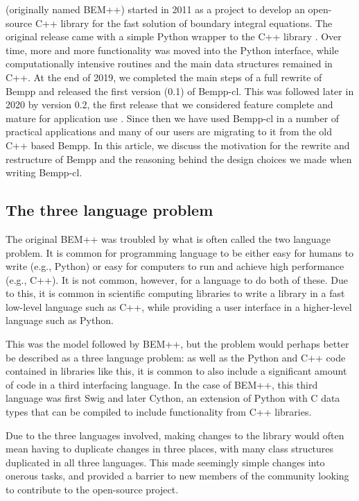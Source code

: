  (originally named BEM++) started in 2011 as a project to develop an open-source C++ library for the fast solution of boundary integral equations. The original release came with a simple Python wrapper to the C++ library \cite{bempp_orig}. Over time, more and more functionality was moved into the Python interface, while computationally intensive routines and the main data structures remained in C++.
At the end of 2019, we completed the main steps of a full rewrite of Bempp and released the first version (0.1) of Bempp-cl. This was followed later in 2020 by version 0.2, the first release that we considered feature complete and mature for application use \cite{Bempp-cl}. Since then we have used Bempp-cl in a number of practical applications and many of our users are migrating to it from the old C++ based Bempp. In this article, we discuss the motivation for the rewrite and restructure of Bempp and the reasoning behind the design choices we made when writing Bempp-cl.

\subsection{The three language problem}
The original BEM++ was troubled by what is often called the two language problem. It is common for programming language to be either easy for humans to write (e.g., Python) or easy for computers to run and achieve high performance (e.g., C++). It is not common, however, for a language to do both of these. Due to this, it is common in scientific computing libraries to write a library in a fast low-level language such as C++, while providing a user interface in a higher-level language such as Python.

This was the model followed by BEM++, but the problem would perhaps better be described as a three language problem: as well as the Python and C++ code contained in libraries like this, it is common to also include a significant amount of code in a third interfacing language. In the case of BEM++, this third language was first Swig and later Cython, an extension of Python with C data types that can be compiled to include functionality from C++ libraries.

Due to the three languages involved, making changes to the library would often mean having to duplicate changes in three places, with many class structures duplicated in all three languages. This made seemingly simple changes into onerous tasks, and provided a barrier to new members of the community looking to contribute to the open-source project.

